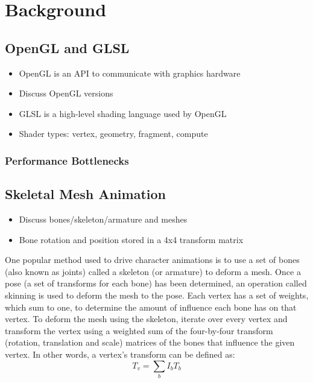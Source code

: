 \section{Background}

\subsection{OpenGL and GLSL}
\ifsummaries
\begin{itemize}
 \item OpenGL is an API to communicate with graphics hardware
 \item Discuss OpenGL versions
 \item GLSL is a high-level shading language used by OpenGL
 \item Shader types: vertex, geometry, fragment, compute
\end{itemize}
\fi


\subsubsection{Performance Bottlenecks}


\subsection{Skeletal Mesh Animation}
\ifsummaries
\begin{itemize}
 \item Discuss bones/skeleton/armature and meshes
 \item Bone rotation and position stored in a 4x4 transform matrix
\end{itemize}
\fi

One popular method used to drive character animations is to use a set of bones (also known as joints) called a skeleton (or armature) to deform a mesh.
Once a pose (a set of transforms for each bone) has been determined, an operation called skinning is used to deform the mesh to the pose.
Each vertex has a set of weights, which sum to one, to determine the amount of influence each bone has on that vertex.
To deform the mesh using the skeleton, iterate over every vertex and transform the vertex using a weighted sum of the four-by-four transform (rotation, translation and scale) matrices of the bones that influence the given vertex.
In other words, a vertex's transform can be defined as:
\begin{equation}
 \label{eq:skinning}
 T_v = \sum_b{I_bT_b}
\end{equation}

